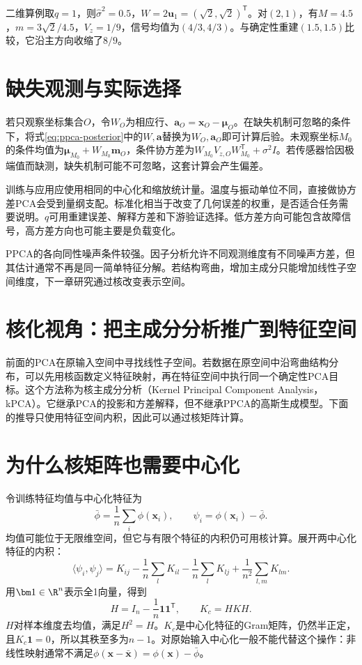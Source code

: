 二维算例取$q=1$，则$\hat\sigma^2=0.5$，$W=2\bm u_1=(\sqrt2,\sqrt2)^{\mathsf T}$。对$(2,1)$，有$M=4.5$，$m=3\sqrt2/4.5$，$V_z=1/9$，信号均值为$(4/3,4/3)$。与确定性重建$(1.5,1.5)$比较，它沿主方向收缩了$8/9$。

\section{缺失观测与实际选择}
若只观察坐标集合$O$，令$W_O$为相应行、$\bm a_O=\bm x_O-\bm\mu_O$。在缺失机制可忽略的条件下，将式\eqref{eq:ppca-posterior}中的$W,\bm a$替换为$W_O,\bm a_O$即可计算后验。未观察坐标$M_0$的条件均值为$\bm\mu_{M_0}+W_{M_0}\bm m_O$，条件协方差为$W_{M_0}V_{z,O}W_{M_0}^{\mathsf T}+\sigma^2I$。若传感器恰因极端值而缺测，缺失机制可能不可忽略，这套计算会产生偏差。

训练与应用应使用相同的中心化和缩放统计量。温度与振动单位不同，直接做协方差PCA会受到量纲支配。标准化相当于改变了几何误差的权重，是否适合任务需要说明。$q$可用重建误差、解释方差和下游验证选择。低方差方向可能包含故障信号，高方差方向也可能主要是负载变化。

PPCA的各向同性噪声条件较强。因子分析允许不同观测维度有不同噪声方差，但其估计通常不再是同一简单特征分解。若结构弯曲，增加主成分只能增加线性子空间维度，下一章研究通过核改变表示空间。


\section{核化视角：把主成分分析推广到特征空间}
前面的PCA在原输入空间中寻找线性子空间。若数据在原空间中沿弯曲结构分布，可以先用核函数定义特征映射，再在特征空间中执行同一个确定性PCA目标。这个方法称为核主成分分析（Kernel Principal Component Analysis，kPCA）。它继承PCA的投影和方差解释，但不继承PPCA的高斯生成模型。下面的推导只使用特征空间内积，因此可以通过核矩阵计算。

\section{为什么核矩阵也需要中心化}
令训练特征均值与中心化特征为
\begin{equation}
 \bar\phi=\frac1n\sum_i\phi(\bm x_i),\qquad
 \psi_i=\phi(\bm x_i)-\bar\phi.
\end{equation}
均值可能位于无限维空间，但它与有限个特征的内积仍可用核计算。展开两中心化特征的内积：
\begin{equation}
 \langle\psi_i,\psi_j\rangle
 =K_{ij}-\frac1n\sum_lK_{il}-\frac1n\sum_lK_{lj}
 +\frac1{n^2}\sum_{l,m}K_{lm}.
\end{equation}
用$\bm1\in\R^n$表示全1向量，得到
\begin{equation}
 H=I_n-\frac1n\bm1\bm1^{\mathsf T},\qquad K_c=HKH.
 \label{eq:kpca-centered-gram}
\end{equation}
$H$对样本维度去均值，满足$H^2=H$。$K_c$是中心化特征的Gram矩阵，仍然半正定，且$K_c\bm1=0$，所以其秩至多为$n-1$。对原始输入中心化一般不能代替这个操作：非线性映射通常不满足$\phi(\bm x-\bar{\bm x})=\phi(\bm x)-\bar\phi$。

